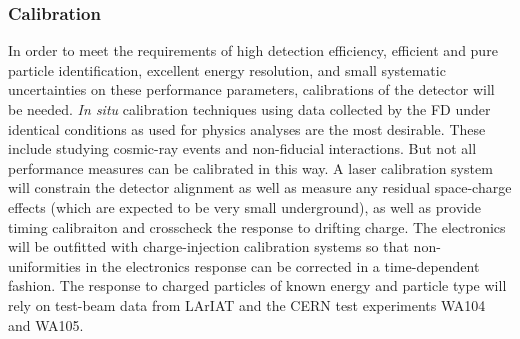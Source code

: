 
\subsubsection{Calibration}

In order to meet the requirements of high detection efficiency, efficient and
pure particle identification, excellent energy resolution, and small systematic
uncertainties on these performance parameters, calibrations of the detector
will be needed.  {\it In situ} calibration techniques using data collected by the FD
under identical conditions as used for physics analyses are the most desirable.
These include studying cosmic-ray events and non-fiducial interactions.  But not
all performance measures can be calibrated in this way.  A laser calibration system
will constrain the detector alignment as well as measure any residual space-charge effects
(which are expected to be very small underground), as well as provide timing calibraiton
and crosscheck the response to drifting charge.  The electronics will be outfitted with
charge-injection calibration systems so that non-uniformities in the electronics response
can be corrected in a time-dependent fashion.  The response to charged particles of known
energy and particle type will rely on test-beam data from LArIAT and the CERN test
experiments WA104 and WA105.


